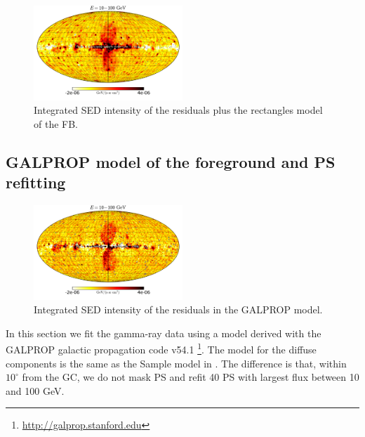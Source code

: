 \begin{figure}[h]
 \includegraphics[width=0.5\textwidth]{plots/Mollweide_Boxes_residual+boxes_03-10GeV_flux_source_range_1.pdf}
 \caption{Integrated SED intensity of the residuals plus the rectangles model of the FB.}
 \label{fig:Maps_Rectangles}
\end{figure}


\subsection{GALPROP model of the foreground and PS refitting}
\label{sec:galprop_model}


\begin{figure}[h]
\centering
 \includegraphics[width=0.5\textwidth]{plots/Mollweide_GALPROP_source_range2.pdf}
 \caption{Integrated SED intensity of the residuals in the GALPROP model.}
 \label{fig:Maps_GALPROP}
\end{figure}

In this section we fit the gamma-ray data using a model derived with the GALPROP
galactic propagation code v54.1
\citep{Moskalenko:1997gh, Strong:1998fr, Strong:2004de, Ptuskin:2005ax, 2007ARNPS..57..285S, Porter:2008ve,Vladimirov:2010aq}\footnote{\url{http://galprop.stanford.edu}}. 
The model for the diffuse components is the same as the Sample model in \cite{2017ApJ...840...43A}.
The difference is that, within $10^\circ$ from the GC, we do not mask PS and refit 40 PS with largest 
flux between 10 and 100 GeV.

